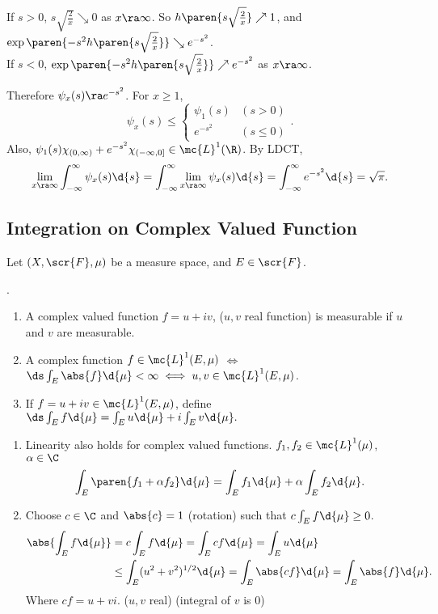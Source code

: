If \(s > 0\), \(s\sqrt{\frac{2}{x}} \searrow 0\) as \(x \ra \infty\). So \(h\paren{s\sqrt{\frac{2}{x}}} \nearrow 1\), and \(\exp\paren{-s^2h\paren{s\sqrt{\frac{2}{x}}}} \searrow e^{-s^2}\). \\
If \(s < 0\), \(\exp\paren{-s^2 h\paren{s\sqrt{\frac{2}{x}}}} \nearrow e^{-s^2}\) as \(x \ra\infty\).

Therefore \(\psi_x(s) \ra e^{-s^2}\). For \(x\geq 1\),
\[
    \psi_x(s) \leq \begin{cases}
        \psi_1(s) & (s > 0)    \\
        e^{-s^2}  & (s \leq 0)
    \end{cases}.
\]
Also, \(\psi_1(s) \chi_{(0, \infty)} + e^{-s^2} \chi_{(-\infty, 0]} \in \mc{L}^{1}(\R)\). By LDCT,
\[
    \lim_{x \ra \infty} \int_{-\infty}^{\infty} \psi_x(s) \d{s} = \int_{-\infty}^{\infty} \lim_{x \ra \infty} \psi_x(s) \d{s} = \int_{-\infty}^{\infty} e^{-s^2} \d{s} = \sqrt{\pi}.
\]

\subsection*{Integration on Complex Valued Function}

Let \((X, \scr{F}, \mu)\) be a measure space, and \(E \in \scr{F}\).

.
\begin{enumerate}
    \item A complex valued function \(f = u + iv\), (\(u, v\) real function) is measurable if \(u\) and \(v\) are measurable.
    \item A complex function \(f \in \mc{L}^{1}(E, \mu)\) \(\iff\) \(\ds \int_E \abs{f} \d{\mu} < \infty \iff u, v \in \mc{L}^{1}(E, \mu)\).
    \item If \(f = u + iv \in \mc{L}^{1}(E, \mu)\), define \(\ds \int_E f \d{\mu} = \int_E u \d{\mu} + i\int_E v \d{\mu}.\)
\end{enumerate}

\rmk
\begin{enumerate}
    \item Linearity also holds for complex valued functions. \(f_1, f_2 \in \mc{L}^{1}(\mu)\), \(\alpha \in \C\)
          \[
              \int_E \paren{f_1 + \alpha f_2} \d{\mu} = \int_E f_1 \d{\mu} +  \alpha \int_E f_2 \d{\mu}.
          \]
    \item Choose \(c \in \C\) and \(\abs{c} = 1\) (rotation) such that \(c \int_E f \d{\mu} \geq 0\).
          \[
              \begin{aligned}
                  \abs{\int_E f \d{\mu}} & = c \int_E f\d{\mu} = \int_E cf \d{\mu} = \int_E u \d{\mu}                              \\
                                         & \leq \int_E (u^2+v^2)^{1/2} \d{\mu} = \int_E \abs{cf} \d{\mu} = \int_E \abs{f} \d{\mu}.
              \end{aligned}
          \]
          Where \(cf = u + vi\). (\(u, v\) real) (integral of \(v\) is 0)
\end{enumerate}

